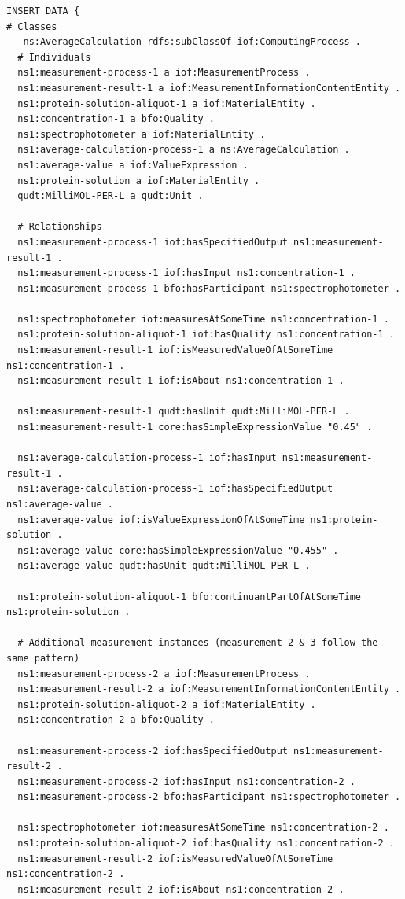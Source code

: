 \begin{verbatim}
INSERT DATA {
# Classes
   ns:AverageCalculation rdfs:subClassOf iof:ComputingProcess .  
  # Individuals
  ns1:measurement-process-1 a iof:MeasurementProcess .
  ns1:measurement-result-1 a iof:MeasurementInformationContentEntity .
  ns1:protein-solution-aliquot-1 a iof:MaterialEntity .
  ns1:concentration-1 a bfo:Quality .
  ns1:spectrophotometer a iof:MaterialEntity .
  ns1:average-calculation-process-1 a ns:AverageCalculation .
  ns1:average-value a iof:ValueExpression .
  ns1:protein-solution a iof:MaterialEntity .
  qudt:MilliMOL-PER-L a qudt:Unit .
  
  # Relationships
  ns1:measurement-process-1 iof:hasSpecifiedOutput ns1:measurement-result-1 .
  ns1:measurement-process-1 iof:hasInput ns1:concentration-1 .
  ns1:measurement-process-1 bfo:hasParticipant ns1:spectrophotometer .
  
  ns1:spectrophotometer iof:measuresAtSomeTime ns1:concentration-1 .
  ns1:protein-solution-aliquot-1 iof:hasQuality ns1:concentration-1 .
  ns1:measurement-result-1 iof:isMeasuredValueOfAtSomeTime ns1:concentration-1 .
  ns1:measurement-result-1 iof:isAbout ns1:concentration-1 .
  
  ns1:measurement-result-1 qudt:hasUnit qudt:MilliMOL-PER-L .
  ns1:measurement-result-1 core:hasSimpleExpressionValue "0.45" .
  
  ns1:average-calculation-process-1 iof:hasInput ns1:measurement-result-1 .
  ns1:average-calculation-process-1 iof:hasSpecifiedOutput ns1:average-value .
  ns1:average-value iof:isValueExpressionOfAtSomeTime ns1:protein-solution .
  ns1:average-value core:hasSimpleExpressionValue "0.455" .
  ns1:average-value qudt:hasUnit qudt:MilliMOL-PER-L .
  
  ns1:protein-solution-aliquot-1 bfo:continuantPartOfAtSomeTime ns1:protein-solution .
  
  # Additional measurement instances (measurement 2 & 3 follow the same pattern)
  ns1:measurement-process-2 a iof:MeasurementProcess .
  ns1:measurement-result-2 a iof:MeasurementInformationContentEntity .
  ns1:protein-solution-aliquot-2 a iof:MaterialEntity .
  ns1:concentration-2 a bfo:Quality .
  
  ns1:measurement-process-2 iof:hasSpecifiedOutput ns1:measurement-result-2 .
  ns1:measurement-process-2 iof:hasInput ns1:concentration-2 .
  ns1:measurement-process-2 bfo:hasParticipant ns1:spectrophotometer .
  
  ns1:spectrophotometer iof:measuresAtSomeTime ns1:concentration-2 .
  ns1:protein-solution-aliquot-2 iof:hasQuality ns1:concentration-2 .
  ns1:measurement-result-2 iof:isMeasuredValueOfAtSomeTime ns1:concentration-2 .
  ns1:measurement-result-2 iof:isAbout ns1:concentration-2 .
  

\end{verbatim}
